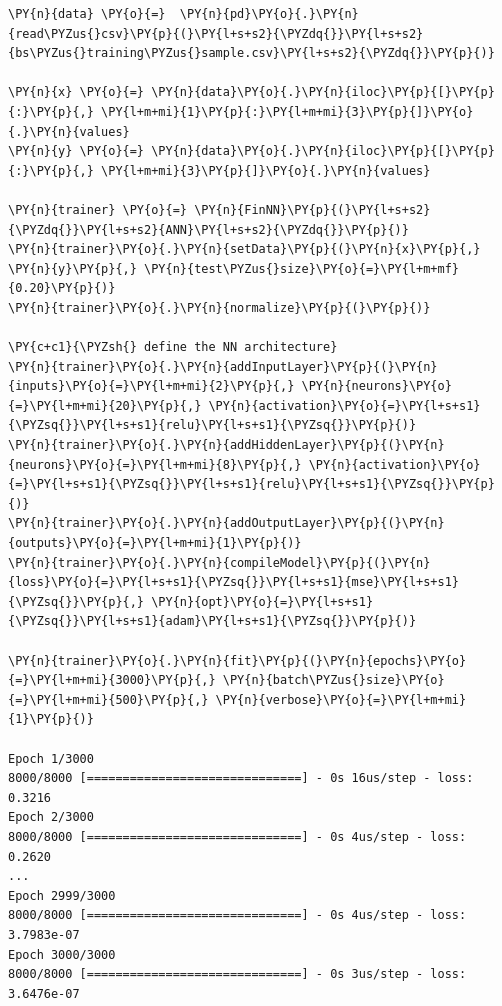 \begin{codebox}[breakable, size=fbox, boxrule=1pt, pad at break*=1mm,colback=cellbackground, colframe=cellborder]
\begin{Verbatim}[commandchars=\\\{\}]
\PY{n}{data} \PY{o}{=}  \PY{n}{pd}\PY{o}{.}\PY{n}{read\PYZus{}csv}\PY{p}{(}\PY{l+s+s2}{\PYZdq{}}\PY{l+s+s2}{bs\PYZus{}training\PYZus{}sample.csv}\PY{l+s+s2}{\PYZdq{}}\PY{p}{)}
	
\PY{n}{x} \PY{o}{=} \PY{n}{data}\PY{o}{.}\PY{n}{iloc}\PY{p}{[}\PY{p}{:}\PY{p}{,} \PY{l+m+mi}{1}\PY{p}{:}\PY{l+m+mi}{3}\PY{p}{]}\PY{o}{.}\PY{n}{values}
\PY{n}{y} \PY{o}{=} \PY{n}{data}\PY{o}{.}\PY{n}{iloc}\PY{p}{[}\PY{p}{:}\PY{p}{,} \PY{l+m+mi}{3}\PY{p}{]}\PY{o}{.}\PY{n}{values}

\PY{n}{trainer} \PY{o}{=} \PY{n}{FinNN}\PY{p}{(}\PY{l+s+s2}{\PYZdq{}}\PY{l+s+s2}{ANN}\PY{l+s+s2}{\PYZdq{}}\PY{p}{)}
\PY{n}{trainer}\PY{o}{.}\PY{n}{setData}\PY{p}{(}\PY{n}{x}\PY{p}{,} \PY{n}{y}\PY{p}{,} \PY{n}{test\PYZus{}size}\PY{o}{=}\PY{l+m+mf}{0.20}\PY{p}{)}
\PY{n}{trainer}\PY{o}{.}\PY{n}{normalize}\PY{p}{(}\PY{p}{)}
	
\PY{c+c1}{\PYZsh{} define the NN architecture}
\PY{n}{trainer}\PY{o}{.}\PY{n}{addInputLayer}\PY{p}{(}\PY{n}{inputs}\PY{o}{=}\PY{l+m+mi}{2}\PY{p}{,} \PY{n}{neurons}\PY{o}{=}\PY{l+m+mi}{20}\PY{p}{,} \PY{n}{activation}\PY{o}{=}\PY{l+s+s1}{\PYZsq{}}\PY{l+s+s1}{relu}\PY{l+s+s1}{\PYZsq{}}\PY{p}{)}
\PY{n}{trainer}\PY{o}{.}\PY{n}{addHiddenLayer}\PY{p}{(}\PY{n}{neurons}\PY{o}{=}\PY{l+m+mi}{8}\PY{p}{,} \PY{n}{activation}\PY{o}{=}\PY{l+s+s1}{\PYZsq{}}\PY{l+s+s1}{relu}\PY{l+s+s1}{\PYZsq{}}\PY{p}{)}
\PY{n}{trainer}\PY{o}{.}\PY{n}{addOutputLayer}\PY{p}{(}\PY{n}{outputs}\PY{o}{=}\PY{l+m+mi}{1}\PY{p}{)}
\PY{n}{trainer}\PY{o}{.}\PY{n}{compileModel}\PY{p}{(}\PY{n}{loss}\PY{o}{=}\PY{l+s+s1}{\PYZsq{}}\PY{l+s+s1}{mse}\PY{l+s+s1}{\PYZsq{}}\PY{p}{,} \PY{n}{opt}\PY{o}{=}\PY{l+s+s1}{\PYZsq{}}\PY{l+s+s1}{adam}\PY{l+s+s1}{\PYZsq{}}\PY{p}{)}
	
\PY{n}{trainer}\PY{o}{.}\PY{n}{fit}\PY{p}{(}\PY{n}{epochs}\PY{o}{=}\PY{l+m+mi}{3000}\PY{p}{,} \PY{n}{batch\PYZus{}size}\PY{o}{=}\PY{l+m+mi}{500}\PY{p}{,} \PY{n}{verbose}\PY{o}{=}\PY{l+m+mi}{1}\PY{p}{)}

Epoch 1/3000
8000/8000 [==============================] - 0s 16us/step - loss: 0.3216
Epoch 2/3000
8000/8000 [==============================] - 0s 4us/step - loss: 0.2620
...
Epoch 2999/3000
8000/8000 [==============================] - 0s 4us/step - loss: 3.7983e-07
Epoch 3000/3000
8000/8000 [==============================] - 0s 3us/step - loss: 3.6476e-07


\end{Verbatim}
\end{codebox}
